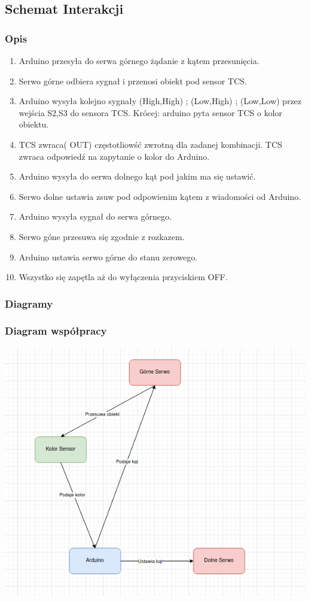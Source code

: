 \documentclass[12pt]{article}
\begin{document}
\subsection{Schemat Interakcji}
\subsubsection{Opis}
\begin{enumerate}

\item Arduino przesyła do serwa górnego żądanie z kątem przesunięcia. \item Serwo górne odbiera sygnał i przenosi obiekt pod sensor TCS.\item  Arduino wysyła kolejno sygnały (High,High) ; (Low,High) ; (Low,Low)  przez wejścia S2,S3 do sensora TCS. Krócej: arduino pyta sensor TCS o kolor obiektu. \item TCS zwraca( OUT) częstotliowść zwrotną dla zadanej kombinacji. TCS zwraca odpowiedź na zapytanie o kolor do Arduino.\item  Arduino wysyła do serwa dolnego kąt pod jakim ma się ustawić. \item Serwo dolne ustawia zsuw pod odpowienim kątem z wiadomości od Arduino. \item Arduino wysyła sygnał do serwa górnego. \item Serwo góne przesuwa się zgodnie z rozkazem. \item Arduino ustawia serwo górne do stanu zerowego.\item  Wszystko się zapętla aż do wyłączenia przyciskiem OFF.
\end{enumerate}
\subsubsection{Diagramy}
\subsubsection{Diagram współpracy}
\hspace{-1.75cm}%
    \includegraphics[scale=0.8]{wspol.png}
\end{document}
